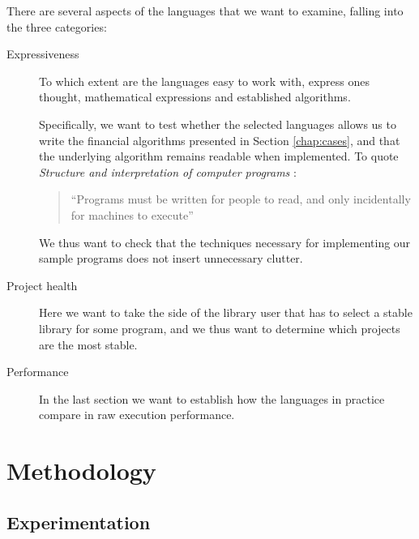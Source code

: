
There are several aspects of the languages that we want to examine,
falling into the three categories:

\begin{description}
\item[Expressiveness] To which extent are the languages easy to work
  with, express ones thought, mathematical expressions and established
  algorithms. 

  Specifically, we want to test whether the selected languages allows
  us to write the financial algorithms presented in Section
  \ref{chap:cases}, and that the underlying algorithm remains readable
  when implemented. To quote \emph{Structure and interpretation of
    computer programs} :

  \begin{quote}
    ``Programs must be written for people to read, and only
    incidentally for machines to execute''
  \end{quote}

  We thus want to check that the techniques necessary for implementing
  our sample programs does not insert unnecessary clutter.
  
\item[Project health] Here we want to take the side of the library
  user that has to select a stable library for some program, and we
  thus want to determine which projects are the most stable.

\item[Performance] In the last section we want to establish how the
  languages in practice compare in raw execution performance.
\end{description}


\section{Methodology}
\subsection{Experimentation}

